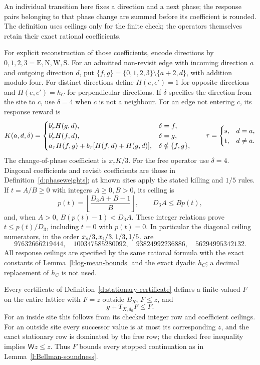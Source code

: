 An individual transition here fixes a direction and a next phase;
the response pairs belonging to that phase change are summed before
its coefficient is rounded. The definition uses ceilings only for
the finite check; the operators themselves retain their exact
rational coefficients.

For explicit reconstruction of those coefficients, encode directions
by \(0,1,2,3=\mathrm E,\mathrm N,\mathrm W,\mathrm S\).
For an admitted non-revisit edge with incoming direction \(a\)
and outgoing direction \(d\), put
\(\{f,g\}=\{0,1,2,3\}\setminus\{a+2,d\}\), with addition
modulo four. For distinct directions define
\(H(e,e')=1\) for opposite directions and \(H(e,e')=h_C\)
for perpendicular directions. If \(\delta\) specifies the direction
from the site to \(c\), use \(\delta=4\) when \(c\) is not a
neighbour. For an edge not entering \(c\), its response reward is
\[
 K(a,d,\delta)=
 \begin{cases}
 b'_\tau H(g,d),&\delta=f,\\
 b'_\tau H(f,d),&\delta=g,\\
 a_\tau H(f,g)+b_\tau[H(f,d)+H(g,d)],&\delta\notin\{f,g\},
 \end{cases}
 \qquad \tau=\begin{cases}{\rm s},&d=a,\\{\rm t},&d\ne a.\end{cases}
\]
The change-of-phase coefficient is \(x_\tau K/3\). For the free
operator use \(\delta=4\). Diagonal coefficients and revisit
coefficients are those in Definition~\ref{d:phaseweights};
at known sites apply the stated killing and \(1/5\) rules.
If \(t=A/B\ge0\) with integers \(A\ge0,B>0\), its ceiling is
\[
 p(t)=\left\lfloor\frac{D_3A+B-1}{B}\right\rfloor,
 \qquad D_3A\le Bp(t),
\]
and, when \(A>0\), \(B(p(t)-1)<D_3A\). These integer relations
prove \(t\le p(t)/D_3\), including \(t=0\) with \(p(t)=0\).
In particular the diagonal ceiling numerators, in the order
\(x_{\rm s}/3,x_{\rm t}/3,1/3,1/5\), are
\[
 97632666219444,\quad100347585280092,\quad
 93824992236886,\quad56294995342132 .
\]
All response ceilings are specified by the same rational formula
with the exact constants of Lemma~\ref{l:log-mean-bounds} and the
exact dyadic \(h_C\); a decimal replacement of \(h_C\) is not used.

\begin{lemma}\label{l:stationary-local-global}
Every certificate of Definition~\ref{d:stationary-certificate}
defines a finite-valued \(F\) on the entire lattice with
\(F=z\) outside \(B_R\), \(F\le z\), and
\[
 g+T_{X,d_0}F\le F .
\]
For an inside site this follows from its checked integer row and
coefficient ceilings. For an outside site every successor value
is at most its corresponding \(z\), and the exact stationary row
is dominated by the free row; the checked free inequality
implies \(\mathsf Wz\le z\).
Thus \(F\) bounds every stopped continuation as in
Lemma~\ref{l:Bellman-soundness}.
\end{lemma}

